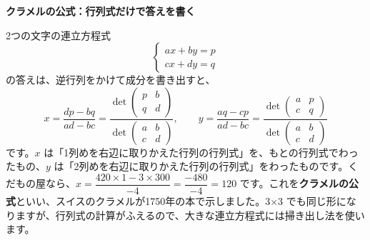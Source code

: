 \begin{motto}[4]
\textbf{クラメルの公式：行列式だけで答えを書く}\par
2つの文字の連立方程式
\[ \begin{cases}ax+by=p\\cx+dy=q\end{cases} \]
の答えは、逆行列をかけて成分を書き出すと、
\[ x=\frac{dp-bq}{ad-bc}=\frac{\det\begin{pmatrix}p&b\\q&d\end{pmatrix}}{\det\begin{pmatrix}a&b\\c&d\end{pmatrix}},\qquad y=\frac{aq-cp}{ad-bc}=\frac{\det\begin{pmatrix}a&p\\c&q\end{pmatrix}}{\det\begin{pmatrix}a&b\\c&d\end{pmatrix}} \]
です。$x$ は「1列めを右辺に取りかえた行列の行列式」を、もとの行列式でわったもの、$y$ は「2列めを右辺に取りかえた行列の行列式」をわったものです。くだもの屋なら、$x=\dfrac{420\times1-3\times300}{-4}=\dfrac{-480}{-4}=120$ です。これを\textbf{クラメルの公式}といい、スイスのクラメルが1750年の本で示しました。3×3 でも同じ形になりますが、行列式の計算がふえるので、大きな連立方程式には掃き出し法を使います。
\end{motto}


